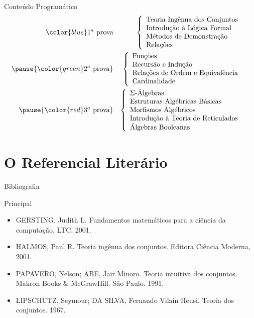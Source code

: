 \documentclass{beamer}
\begin{document}
	\begin{frame}{Conteúdo Programático}
		\begin{eqnarray*}
			{\color{blue}1^a \text{ prova}} & & \left\{\begin{array}{ll}
				\text{Teoria Ingênua dos Conjuntos}&\\	
				\text{Introdução à Lógica Formal}&\\
				\text{Métodos de Demonstração}&\\
				\text{Relações}&
			\end{array}\right.\\\pause
			{\color{green}2^a \text{ prova}} & & \left\{\begin{array}{ll}
				\text{Funções}&\\	
				\text{Recursão e Indução}&\\
				\text{Relações de Ordem e Equivalência}&\\
				\text{Cardinalidade}&
			\end{array}\right.\\\pause
			{\color{red}3^a \text{ prova}} & & \left\{\begin{array}{ll}
			\Sigma\text{-Álgebras}&\\	
			\text{Estruturas Algébricas Básicas}&\\
			\text{Morfismos Algébricos}&\\
			\text{Introdução à Teoria de Reticulados}&\\
			\text{Álgebras Booleanas}&
			\end{array}\right.
		\end{eqnarray*}
	\end{frame}
	
	\section{O Referencial Literário}
	
	\begin{frame}{Bibliografia}
		\begin{block}{Principal}
			\begin{itemize}
				\item GERSTING, Judith L. Fundamentos matemáticos para a ciência da computação. LTC, 2001.
				\item HALMOS, Paul R. Teoria ingênua dos conjuntos. Editora Ciência Moderna, 2001.
				\item PAPAVERO, Nelson; ABE, Jair Minoro. Teoria intuitiva dos conjuntos. Makron Books $\&$ McGrawHill. São Paulo. 1991.
				\item LIPSCHUTZ, Seymour; DA SILVA, Fernando Vilain Heusi. Teoria dos conjuntos. 1967.
			\end{itemize}
		\end{block}
	\end{frame}
\end{document}
